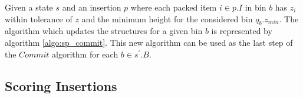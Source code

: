 Given a state $s$ and an insertion $p$ where each packed item $i \in p.I$ in bin $b$ has $z_i$ within tolerance of $z$ and the minimum height for the considered bin $q_b.z_{min}$.
The algorithm which updates the structures for a given bin $b$ is represented by algorithm \ref{algo:sp_commit}.
This new algorithm can be used as the last step of the $Commit$ algorithm for each $b \in s^\prime.B$.



\subsection{Scoring Insertions}
\label{ssec:scoring_insertions}%